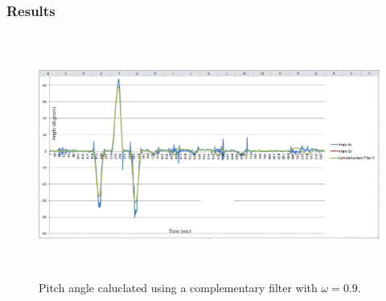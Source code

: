 \subsubsection{Results}

\begin{figure}[H]
	\centering
	\includegraphics[height=8cm]{assets/compl_filter_0.9.png}
	\caption{Pitch angle caluclated using a complementary filter with $\omega = 0.9$.}
	\label{fig:battery}
\end{figure}

